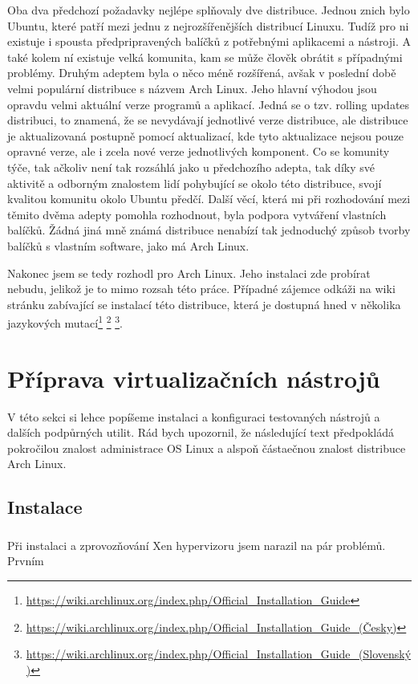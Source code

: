 Oba dva předchozí požadavky nejlépe splňovaly dve distribuce. Jednou znich bylo Ubuntu, které patří mezi jednu z nejrozšířenějších distribucí Linuxu. Tudíž pro ni existuje i spousta předpripravených balíčků z potřebnými aplikacemi a nástroji. A také kolem ní existuje velká komunita, kam se může člověk obrátit s případnými problémy. Druhým adeptem byla o něco méně rozšířená, avšak v poslední době velmi populární distribuce s názvem Arch Linux. Jeho hlavní výhodou jsou opravdu velmi aktuální verze programů a aplikací. Jedná se o tzv. rolling updates distribuci, to znamená, že se nevydávají jednotlivé verze distribuce, ale distribuce je aktualizovaná postupně pomocí aktualizací, kde tyto aktualizace nejsou pouze opravné verze, ale i zcela nové verze jednotlivých komponent. Co se komunity týče, tak ačkoliv není tak rozsáhlá jako u předchozího adepta, tak díky své aktivitě a odborným znalostem lidí pohybující se okolo této distribuce, svojí kvalitou komunitu okolo Ubuntu předčí. Další věcí, která mi při rozhodování mezi těmito dvěma adepty pomohla rozhodnout, byla podpora vytváření vlastních balíčků. Žádná jiná mně známá distribuce nenabízí tak jednoduchý způsob tvorby balíčků s vlastním software, jako má Arch Linux.

Nakonec jsem se tedy rozhodl pro Arch Linux. Jeho instalaci zde probírat nebudu, jelikož je to mimo rozsah této práce. Případné zájemce odkáži na wiki stránku zabívající se instalací této distribuce, která je dostupná hned v několika jazykových mutací\footnote{\url{https://wiki.archlinux.org/index.php/Official\_Installation\_Guide}}
\footnote{\url{https://wiki.archlinux.org/index.php/Official\_Installation\_Guide\_(Česky)}}
\footnote{\url{https://wiki.archlinux.org/index.php/Official\_Installation\_Guide\_(Slovenský)}}.

 

\section{Příprava virtualizačních nástrojů}
V této sekci si lehce popíšeme instalaci a konfiguraci testovaných nástrojů a dalších podpůrných utilit. Rád bych upozornil, že následující text předpokládá pokročilou znalost administrace OS Linux a alspoň částaečnou znalost distribuce Arch Linux.
\subsection{Instalace}
\subsubsection{\xen}
Při instalaci a zprovozňování Xen hypervizoru jsem narazil na pár problémů. Prvním 
